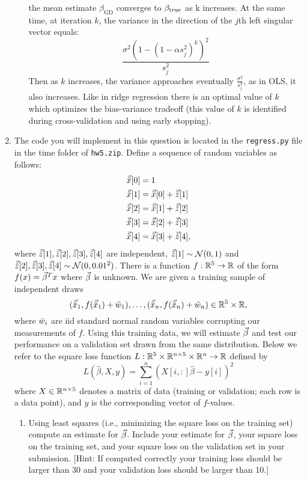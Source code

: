 \documentclass[12pt,twoside]{article}
\begin{document}
\begin{enumerate}
\begin{enumerate}
the mean estimate $\beta_{\text{GD}}$ converges to $\beta_{\operatorname{true}}$ as k increases.
At the same time, at iteration $k$, the variance in the direction of the $j$th left singular vector equals:
	$$\frac{\sigma^2 (1 - (1 - \alpha s_j^2)^k)^2}  {s_j^2}$$
Then as $k$ increases, the variance approaches eventually $\frac{\sigma^2}{s_j^2}$, as in OLS, it also increases.
Like in ridge regression there is an optimal value of $k$ which optimizes the bias-variance tradeoff (this value of $k$ is identified during cross-validation and using early stopping).
 
 \end{enumerate}
 
\item The code you will implement in this question is located in the
  \verb|regress.py| file in the time folder of  \verb|hw5.zip|.
  Define a sequence of random variables as follows:
  \begin{align*}
    \vec{\tilde{ x }} [0] &= 1\\
    \vec{\tilde{ x }}[1] &= \vec{\tilde{ x }}[0]+\vec{\tilde{ z }}[1]\\
    \vec{\tilde{ x }}[2] &= \vec{\tilde{ x }}[1]+\vec{\tilde{ z }}[2]\\
    \vec{\tilde{ x }}[3] &= \vec{\tilde{ x }}[2]+\vec{\tilde{ z }}[3]\\
    \vec{\tilde{ x }}[4] &= \vec{\tilde{ x }}[3]+\vec{\tilde{ z }}[4],
  \end{align*}
  where $\vec{\tilde{ z }}[1],\vec{\tilde{ z }}[2],\vec{\tilde{ z }}[3],\vec{\tilde{ z }}[4]$ are independent,
  $\vec{\tilde{ z }}[1]\sim\operatorname{\mathcal{N}}(0,1)$ and
  $\vec{\tilde{ z }}[2],\vec{\tilde{ z }}[3],\vec{\tilde{ z }}[4]\sim\operatorname{\mathcal{N}}(0,0.01^2)$.  There is a function
  $f:\mathbb{R}^5\to\mathbb{R}$ of the form $f(x)=\vec{\beta}^Tx$ where $\vec{\beta}$ is
  unknown.  We are given a training sample of independent draws
  $$(\vec{\tilde{ x }}_1,f(\vec{\tilde{ x }}_1)+\tilde{ w }_1),\ldots,(\vec{\tilde{ x }}_n,f(\vec{\tilde{ x }}_n)+\tilde{ w }_n)\in\mathbb{R}^5\times\mathbb{R},$$
  where $\tilde{ w }_i$ are iid standard normal random variables corrupting
  our measurements of $f$.
  Using this training data, we will estimate $\vec{\beta}$ and test our
  performance on a validation set drawn from the same distribution.
  Below we refer to the square loss function
  $L:\mathbb{R}^5\times\mathbb{R}^{n\times 5}\times\mathbb{R}^n\to\mathbb{R}$ defined by
  $$L(\hat{\beta},X,y) = \sum_{i=1}^n (X[i,:]\hat{\beta}-y[i])^2$$
  where $X\in\mathbb{R}^{n\times 5}$ denotes a matrix of data (training or validation; each row
  is a data point), and $y$ is the corresponding vector of $f$-values.
  \begin{enumerate}
  \item Using least squares (i.e., minimizing the square loss on the
    training set) compute an estimate for $\vec{\beta}$.  Include your
    estimate for $\vec{\beta}$, your square loss on the training set, and
    your square loss on the validation set in your submission.
    [Hint: If computed correctly your training loss should be larger
      than 30 and your validation loss should be larger than 10.]
      

\end{enumerate}
\end{enumerate}
\end{document}
